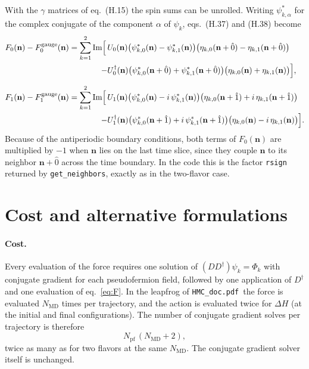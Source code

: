\documentclass[11pt,a4paper]{article}
\newcommand{\n}{\mathbf{n}}
\newcommand{\Npf}{N_{\mathrm{pf}}}
\newcommand{\NMD}{N_{\mathrm{MD}}}
\newcommand{\code}[1]{\texttt{#1}}
\newcommand{\hmcdoc}{\texttt{HMC\_doc.pdf}}
\begin{document}
With the $\gamma$ matrices of eq.~(H.15) the spin sums can be unrolled. Writing $\psi_{k,\alpha}^*$ for the complex
conjugate of the component $\alpha$ of $\psi_k$, eqs.~(H.37) and (H.38) become
\begin{align}
    F_0(\n) - F_0^{\mathrm{gauge}}(\n) = \sum_{k=1}^{2} \mathrm{Im}\Bigl[\,
      &U_0(\n)\bigl(\psi_{k,0}^*(\n)-\psi_{k,1}^*(\n)\bigr)\bigl(\eta_{k,0}(\n+\hat0)-\eta_{k,1}(\n+\hat0)\bigr)
      \nonumber\\
    - &U_0^\dagger(\n)\bigl(\psi_{k,0}^*(\n+\hat0)+\psi_{k,1}^*(\n+\hat0)\bigr)\bigl(\eta_{k,0}(\n)+\eta_{k,1}(\n)\bigr)
      \Bigr],
    \label{eq:F0}
    \\[0.5em]
    F_1(\n) - F_1^{\mathrm{gauge}}(\n) = \sum_{k=1}^{2} \mathrm{Im}\Bigl[\,
      &U_1(\n)\bigl(\psi_{k,0}^*(\n)-i\,\psi_{k,1}^*(\n)\bigr)\bigl(\eta_{k,0}(\n+\hat1)+i\,\eta_{k,1}(\n+\hat1)\bigr)
      \nonumber\\
    - &U_1^\dagger(\n)\bigl(\psi_{k,0}^*(\n+\hat1)+i\,\psi_{k,1}^*(\n+\hat1)\bigr)\bigl(\eta_{k,0}(\n)-i\,\eta_{k,1}(\n)\bigr)
      \Bigr].
    \label{eq:F1}
\end{align}
Because of the antiperiodic boundary conditions, both terms of $F_0(\n)$ are multiplied by $-1$ when $\n$ lies on
the last time slice, since they couple $\n$ to its neighbor $\n+\hat0$ across the time boundary. In the code this is
the factor \code{rsign} returned by \code{get\_neighbors}, exactly as in the two-flavor case.

\section{Cost and alternative formulations}
\label{sec:cost}

\paragraph{Cost.}
Every evaluation of the force requires one solution of $(DD^\dagger)\psi_k = \Phi_k$ with conjugate gradient for
each pseudofermion field, followed by one application of $D^\dagger$ and one evaluation of eq.~\eqref{eq:F}. In the
leapfrog of \hmcdoc\ the force is evaluated $\NMD$ times per trajectory, and the action is evaluated twice for
$\Delta H$ (at the initial and final configurations). The number of conjugate gradient solves per trajectory is
therefore
\begin{equation}
    \Npf\,(\NMD + 2),
\end{equation}
twice as many as for two flavors at the same $\NMD$. The conjugate gradient solver itself is unchanged.
\end{document}
